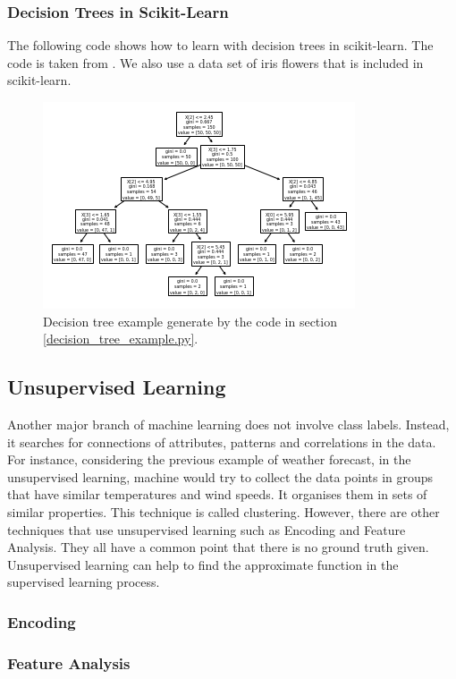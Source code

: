 \documentclass[10pt,a4paper]{article}
\begin{document}
\subsubsection{Decision Trees in Scikit-Learn}
The following code shows how to learn with decision trees in scikit-learn. The code is taken from \cite{DecisionTreesScikitLearn}. We also use a data set of iris flowers that is included in scikit-learn.
\label{decision_tree_example.py}
\begin{figure}[htbp]
    \centering
    \includegraphics[scale=0.9]{decision_tree_iris.png}
    \caption{Decision tree example generate by the code in section \ref{decision_tree_example.py}.}
    \label{fig:decision}
\end{figure}

\subsection{Unsupervised Learning}
Another major branch of machine learning does not involve class labels. Instead, it searches for connections of attributes, patterns and correlations in the data. For instance, considering the previous example of weather forecast, in the unsupervised learning, machine would try to collect the data points in groups that have similar temperatures and wind speeds. It organises them in sets of similar properties. This technique is called clustering. However, there are other techniques that use unsupervised learning such as Encoding and Feature Analysis.
They all have a common point that there is no ground truth given. Unsupervised learning can help to find the approximate function in the supervised learning process.

\subsubsection{Encoding}
\subsubsection{Feature Analysis}
\end{document}
